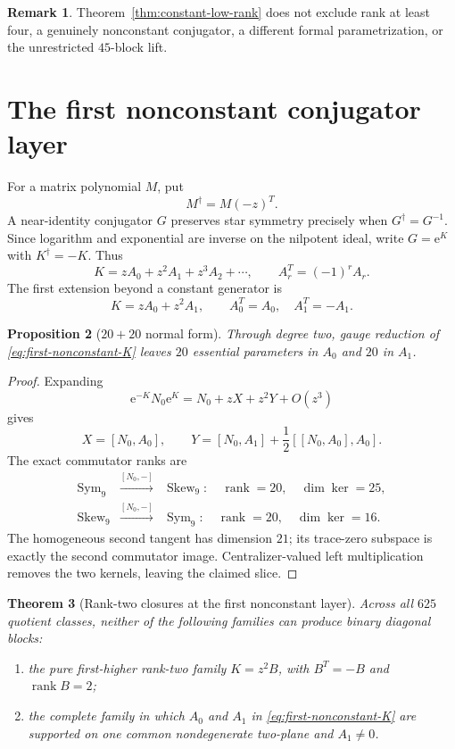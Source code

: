 \documentclass[11pt]{article}
\newtheorem{theorem}{Theorem}[section]
\newtheorem{proposition}[theorem]{Proposition}
\theoremstyle{definition}
\newtheorem{remark}[theorem]{Remark}
\newcommand{\rank}{\operatorname{rank}}
\newcommand{\e}{\mathrm{e}}
\begin{document}
\begin{remark}
Theorem~\ref{thm:constant-low-rank} does not exclude rank at least four,
a genuinely nonconstant conjugator, a different formal parametrization,
or the unrestricted \(45\)-block lift.
\end{remark}

\section{The first nonconstant conjugator layer}
\label{sec:first-nonconstant}

For a matrix polynomial \(M\), put
\[
M^\dagger=M(-z)^T.
\]
A near-identity conjugator \(G\) preserves star symmetry precisely when
\(G^\dagger=G^{-1}\).  Since logarithm and exponential are inverse on the
nilpotent ideal, write \(G=\e^K\) with \(K^\dagger=-K\).  Thus
\[
K=zA_0+z^2A_1+z^3A_2+\cdots,
\qquad A_r^T=(-1)^rA_r.
\tag{9.1}\label{eq:adjoint-parity}
\]
The first extension beyond a constant generator is
\[
K=zA_0+z^2A_1,
\qquad A_0^T=A_0,\quad A_1^T=-A_1.
\tag{9.2}\label{eq:first-nonconstant-K}
\]

\begin{proposition}[\(20+20\) normal form]
\label{prop:20plus20}
Through degree two, gauge reduction of
\eqref{eq:first-nonconstant-K} leaves \(20\) essential parameters in
\(A_0\) and \(20\) in \(A_1\).
\end{proposition}

\begin{proof}
Expanding
\[
\e^{-K}N_0\e^K=N_0+zX+z^2Y+O(z^3)
\]
gives
\[
X=[N_0,A_0],\qquad
Y=[N_0,A_1]+\frac12[[N_0,A_0],A_0].
\]
The exact commutator ranks are
\[
\begin{array}{rcl}
\operatorname{Sym}_9&\xrightarrow{[N_0,-]}&
\operatorname{Skew}_9:
\quad\rank=20,\quad\dim\ker=25,\\
\operatorname{Skew}_9&\xrightarrow{[N_0,-]}&
\operatorname{Sym}_9:
\quad\rank=20,\quad\dim\ker=16.
\end{array}
\]
The homogeneous second tangent has dimension \(21\); its trace-zero
subspace is exactly the second commutator image.  Centralizer-valued
left multiplication removes the two kernels, leaving the claimed slice.
\end{proof}

\begin{theorem}[Rank-two closures at the first nonconstant layer]
\label{thm:first-nonconstant-exclusions}
Across all \(625\) quotient classes, neither of the following families can
produce binary diagonal blocks:
\begin{enumerate}[label=(\alph*)]
\item the pure first-higher rank-two family \(K=z^2B\), with
\(B^T=-B\) and \(\rank B=2\);
\item the complete family in which \(A_0\) and \(A_1\) in
\eqref{eq:first-nonconstant-K} are supported on one common nondegenerate
two-plane and \(A_1\neq0\).
\end{enumerate}
\end{theorem}
\end{document}
